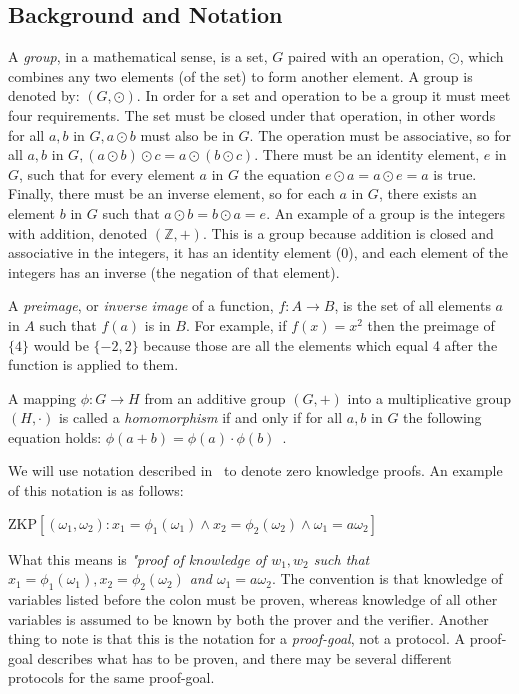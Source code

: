 \documentclass{sig-alternate}
\begin{document}
	\subsection{Background and Notation}
	A \textit{group}, in a mathematical sense, is a set, $G$ paired with an 
	operation, $\odot$, which combines any two elements (of the set) to form 
	another element. A group is denoted by: $(G, \odot)$. In order for a set
	and operation to be a group it must meet four requirements. The set must
	be closed under that operation, in other words for all $a, b$ in $G, a
	\odot b$ must also be in $G$. The operation must be associative, so for
	all $a, b$ in $G, (a \odot b) \odot c = a \odot (b \odot c)$. There must
	be an identity element, $e$ in $G$, such that for every element $a$ in $G$
	the equation $e \odot a = a \odot e = a$ is true. Finally, there must be
	an inverse element, so for each $a$ in $G$, there exists an element $b$ in
	$G$ such that $a \odot b = b \odot a = e$. An example of a group is the
	integers with addition, denoted $(\mathbb{Z}, +)$. This is a group because
	addition is closed and associative in the integers, it has an identity
	element (0), and each element of the integers has an inverse (the negation 
	of that element).
	
	A \textit{preimage}, or \textit{inverse image} of a function, $f:A \rightarrow B$, 
	is the set of all elements $a$ in $A$ such that $f(a)$ is in $B$. For example,
	if $f(x) = x^{2}$ then the preimage of $\{4\}$ would be $\{-2, 2\}$ because those
	are all the elements which equal 4 after the function is applied to them.
	
	A mapping $\phi : G \rightarrow H$ from an additive group $(G, +)$ into a
	multiplicative group $(H, \cdot)$ is called a \textit{homomorphism} if and
	only if for all $a, b$ in $G$ the following equation holds: $\phi(a + b) =
	\phi(a) \cdot \phi(b)$~\cite{Sigma:2009}.
	
	We will use notation described in~\cite{Sigma:2009} to denote zero knowledge
	proofs. An example of this notation is as follows:
	
	\begin{center}
		$\text{ZKP}[(\omega_{1},\omega_{2}):x_{1} = \phi_{1}(\omega_{1}) \land  x_{2} = \phi_{2}(\omega_{2}) \land \omega_{1} = a\omega_{2}]$ 
	\end{center}
	
	What this means is \textit{"proof of knowledge of $w_{1}, w_{2}$ such that 
	$x_{1} = \phi_{1}(\omega_{1}), x_{2} = \phi_{2}(\omega_{2})$ and $\omega_{1} = a\omega_{2}$}.
	The convention is that knowledge of variables listed before the colon
	must be proven, whereas knowledge of all other variables is
	assumed to be known by both the prover and the verifier. Another thing
	to note is that this is the notation for a \textit{proof-goal}, not
	a protocol. A proof-goal describes what has to be proven, and there may
	be several different protocols for the same proof-goal.
\end{document}

